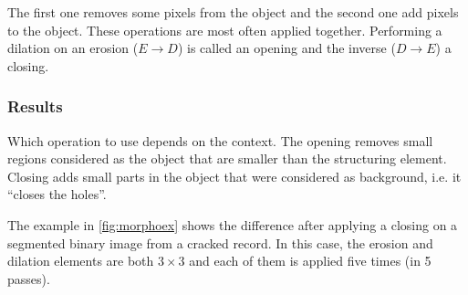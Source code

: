 The first one removes some pixels from the object and the second one add pixels to the object. These operations are most often applied together. Performing a dilation on an erosion ($E \to D$) is called an opening and the inverse ($D \to E$) a closing.

\subsubsection{Results}

Which operation to use depends on the context. The opening removes small regions considered as the object that are smaller than the structuring element. Closing adds small parts in the object that were considered as background, i.e. it ``closes the holes''.

The example in \autoref{fig:morphoex} shows the difference after applying a closing on a segmented binary image from a cracked record. In this case, the erosion and dilation elements are both $3 \times 3$ and each of them is applied five times (in 5 passes).

